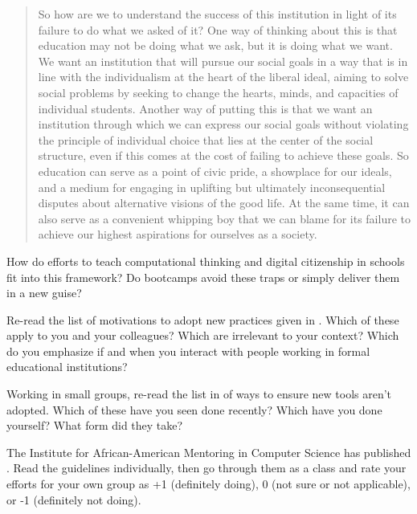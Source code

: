 \begin{quote}

  So how are we to understand the success of this institution
  in light of its failure to do what we asked of it?
  One way of thinking about this is that
  education may not be doing what we ask,
  but it is doing what we want.
  We want an institution that will pursue our social goals
  in a way that is in line with the individualism at the heart of the liberal ideal,
  aiming to solve social problems
  by seeking to change the hearts, minds, and capacities of individual students.
  Another way of putting this is that
  we want an institution through which we can express our social goals
  without violating the principle of individual choice
  that lies at the center of the social structure,
  even if this comes at the cost of failing to achieve these goals.
  So education can serve as a point of civic pride,
  a showplace for our ideals,
  and a medium for engaging in uplifting but ultimately inconsequential disputes
  about alternative visions of the good life.
  At the same time,
  it can also serve as a convenient whipping boy
  that we can blame for its failure to achieve our highest aspirations for ourselves as a society.

\end{quote}

How do efforts to teach computational thinking and digital citizenship in schools
fit into this framework?
Do bootcamps avoid these traps or simply deliver them in a new guise?


Re-read the list of motivations to adopt new practices
given in .
Which of these apply to you and your colleagues?
Which are irrelevant to your context?
Which do you emphasize
if and when you interact with people working in formal educational institutions?


Working in small groups,
re-read the list in  of ways to ensure new tools aren't adopted.
Which of these have you seen done recently?
Which have you done yourself?
What form did they take?


The Institute for African-American Mentoring in Computer Science
has published .
Read the guidelines individually,
then go through them as a class
and rate your efforts for your own group as +1 (definitely doing),
0 (not sure or not applicable),
or -1 (definitely not doing).

